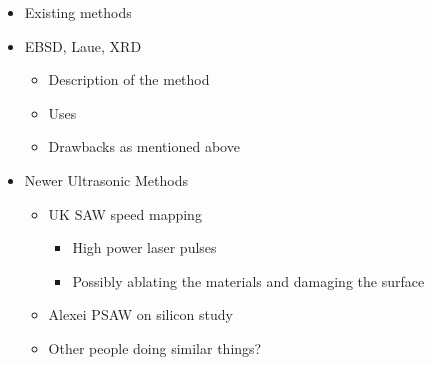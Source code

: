 
\begin{itemize}
\item Existing methods
\item EBSD, Laue, XRD
\begin{itemize}
\item Description of the method
\item Uses
\item Drawbacks as mentioned above
\end{itemize}
\item Newer Ultrasonic Methods
\begin{itemize}
\item UK SAW speed mapping
\begin{itemize}
\item High power laser pulses
\item Possibly ablating the materials and damaging the surface
\end{itemize}
\item Alexei PSAW on silicon study
\item Other people doing similar things?
\end{itemize}
\end{itemize}